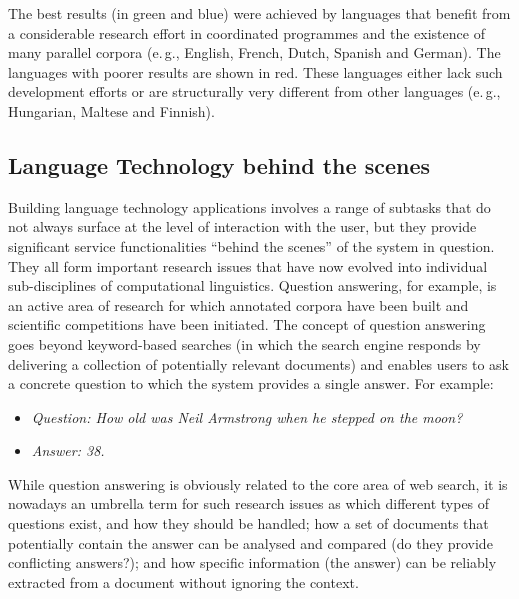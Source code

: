 \begin{multicols}{2}
The best results (in green and blue) were achieved by languages that benefit from a considerable research effort in coordinated programmes and the existence of many parallel corpora (e.\,g., English, French, Dutch, Spanish and German). The languages with poorer results are shown in red. These languages either lack such development efforts or are structurally very different from other languages (e.\,g., Hungarian, Maltese and Finnish).

\subsection{Language Technology behind the scenes}

Building language technology applications involves a range of subtasks that do not always surface at the level of interaction with the user, but they provide significant service functionalities “behind the scenes” of the system in question. They all form important research issues that have now evolved into individual sub-disciplines of computational linguistics.  Question answering, for example, is an active area of research for which annotated corpora have been built and scientific competitions have been initiated. The concept of question answering goes beyond keyword-based searches (in which the search engine responds by delivering a collection of potentially relevant documents) and enables users to ask a concrete question to which the system provides a single answer. For example:

\begin{itemize}
\item[] \textit{Question: How old was Neil Armstrong when he stepped on the moon?}
\item[] \textit{Answer: 38.}
\end{itemize}

While question answering is obviously related to the core area of web search, it is nowadays an umbrella term for such research issues as which different types of questions exist, and how they should be handled; how a set of documents that potentially contain the answer can be analysed and compared (do they provide conflicting answers?); and how specific information (the answer) can be reliably extracted from a document without ignoring the context.



\end{multicols}
